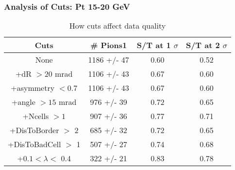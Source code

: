 \frame
{
\frametitle{Analysis of Cuts: Pt 15-20 GeV}
\begin{table}
\caption{How cuts affect data quality}
\centering
\begin{tabular}{c c c c}
\hline\hline
Cuts & \# Pions1 & S/T at 1 $\sigma$ & S/T at 2 $\sigma$ \\ [0.5ex]
\hline
None & 1186 +/-   47 & 0.60 & 0.52 \\ %
+dR $> 20$ mrad & 1106 +/-   43 & 0.67 & 0.60 \\ %
+asymmetry $< 0.7$ & 1106 +/-   43 & 0.67 & 0.60 \\ %
+angle $> 15$ mrad &  976 +/-   39 & 0.72 & 0.65 \\ %
+Ncells $> 1$&  907 +/-   36 & 0.77 & 0.71 \\ %
+DisToBorder $>$ 2 &  685 +/-   32 & 0.72 & 0.65 \\ %
+DisToBadCell $>$ 1&  507 +/-   27 & 0.74 & 0.68 \\ %
+$0.1 < \lambda <$ 0.4 &  322 +/-   21 & 0.83 & 0.78 \\ %
[1ex]
\hline
\end{tabular}
\label{table:nonlin}
\end{table}
}
